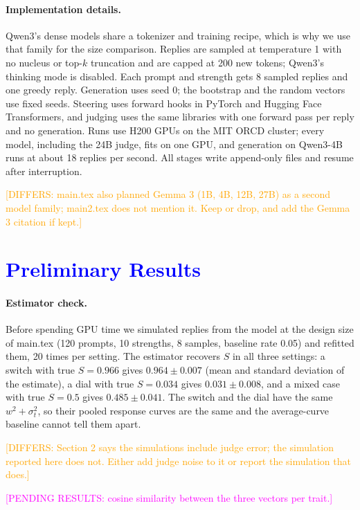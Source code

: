\documentclass[11pt]{article}
\newcommand{\differ}[1]{\textcolor{orange}{[DIFFERS: #1]}}
\newcommand{\upd}[1]{{\color{blue}#1}}
\newcommand{\pending}[1]{\textcolor{magenta}{[PENDING RESULTS: #1]}}
\begin{document}
\upd{\paragraph{Implementation details.} Qwen3's dense models share a tokenizer
and training recipe, which is why we use that family for the size comparison.
Replies are sampled at temperature 1 with no nucleus or top-$k$ truncation and
are capped at 200 new tokens; Qwen3's thinking mode is disabled. Each prompt and
strength gets 8 sampled replies and one greedy reply. Generation uses seed 0;
the bootstrap and the random vectors use fixed seeds. Steering uses forward
hooks in PyTorch and Hugging Face Transformers, and judging uses the same
libraries with one forward pass per reply and no generation. Runs use H200 GPUs
on the MIT ORCD cluster; every model, including the 24B judge, fits on one GPU,
and generation on Qwen3-4B runs at about 18 replies per second. All stages
write append-only files and resume after interruption.}
\differ{main.tex also planned Gemma 3 (1B, 4B, 12B, 27B) as a second model family;
main2.tex does not mention it. Keep or drop, and add the Gemma 3 citation if
kept.}

\section{\textcolor{blue}{Preliminary Results}}

\upd{\paragraph{Estimator check.} Before spending GPU time we simulated replies
from the model at the design size of main.tex (120 prompts, 10 strengths, 8
samples, baseline rate 0.05) and refitted them, 20 times per setting. The
estimator recovers $S$ in all three settings: a switch with true $S = 0.966$
gives $0.964 \pm 0.007$ (mean and standard deviation of the estimate), a dial
with true $S = 0.034$ gives $0.031 \pm 0.008$, and a mixed case with true $S =
0.5$ gives $0.485 \pm 0.041$. The switch and the dial have the same $w^2 +
\sigma_t^2$, so their pooled response curves are the same and the average-curve
baseline cannot tell them apart.}
\differ{Section 2 says the simulations include judge error; the simulation
reported here does not. Either add judge noise to it or report the simulation
that does.}

\pending{cosine similarity between the three vectors per trait.}
\end{document}
